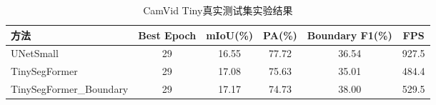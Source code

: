 \begin{table}[H]
\centering
\caption{CamVid Tiny真实测试集实验结果}
\label{tab:camvid_tiny_real}
\begin{tabular}{lccccc}
\toprule
方法 & Best Epoch & mIoU(\%) & PA(\%) & Boundary F1(\%) & FPS \\
\midrule
UNetSmall & 29 & 16.55 & 77.72 & 36.54 & 927.5 \\
TinySegFormer & 29 & 17.08 & 75.63 & 35.01 & 484.4 \\
TinySegFormer_Boundary & 29 & 17.17 & 74.73 & 38.00 & 529.5 \\
\bottomrule
\end{tabular}
\end{table}
